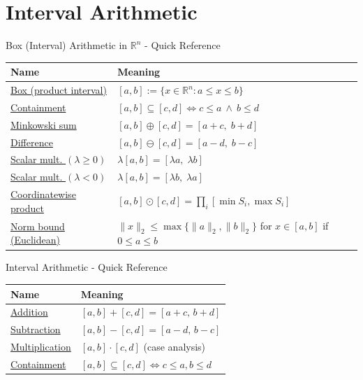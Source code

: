 \section{Interval Arithmetic}

\begin{toolkitbox}{Box (Interval) Arithmetic in $\mathbb{R}^n$ - Quick Reference}
\small
\begin{tabular}{l l}
\toprule
\textbf{Name}  & \textbf{Meaning} \\
\midrule
\hyperref[def:product-interval-box]{Box (product interval)}  & $[a,b] := \{x\in\mathbb{R}^n : a\le x \le b\}$ \\
\hyperref[def:box-contain]{Containment}  & $[a,b]\subseteq[c,d] \iff c\le a \ \land\ b\le d$ \\
\hyperref[def:box-add]{Minkowski sum}  & $[a,b]\oplus[c,d]=[a+c,\; b+d]$ \\
\hyperref[def:box-sub]{Difference}  & $[a,b]\ominus[c,d]=[a-d,\; b-c]$ \\
\hyperref[def:box-smul]{Scalar mult. $(\lambda\ge 0)$}  & $\lambda[a,b]=[\lambda a,\; \lambda b]$ \\
\hyperref[def:box-smul]{Scalar mult. $(\lambda<0)$}  & $\lambda[a,b]=[\lambda b,\; \lambda a]$ \\
\hyperref[def:box-hadamard]{Coordinatewise product}  & $[a,b]\odot[c,d]=\prod_i [\min S_i,\max S_i]$ \\
\hyperref[def:box-hadamard]{Norm bound (Euclidean)}  & $\|x\|_2 \le \max\{\|a\|_2,\|b\|_2\}$ for $x\in[a,b]$ if $0\le a\le b$ \\
\bottomrule
\end{tabular}
\end{toolkitbox}

\begin{toolkitbox}{Interval Arithmetic - Quick Reference}
\small
\begin{tabular}{l l}
\toprule
\textbf{Name}  & \textbf{Meaning} \\
\midrule
\hyperref[def:interval-add]{Addition}        & $[a,b] + [c,d] = [a+c,\, b+d]$           \\
\hyperref[def:interval-sub]{Subtraction}     & $[a,b] - [c,d] = [a-d,\, b-c]$           \\
\hyperref[def:interval-mult]{Multiplication}  & $[a,b] \cdot [c,d]$ (case analysis)      \\
\hyperref[def:interval-contain]{Containment}     & $[a,b] \subseteq [c,d] \iff c\leq a, b\leq d$ \\
\bottomrule
\end{tabular}
\end{toolkitbox}



